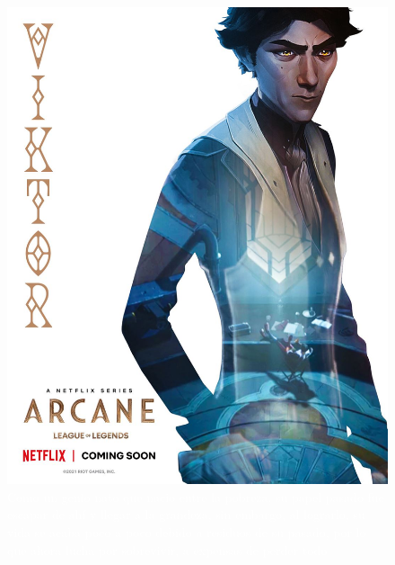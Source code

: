 \documentclass[11pt,A5]{article}
\begin{document}
\begin{figure}
    \includegraphics[scale=0.1, angle=18]{Pelicula. Imagenes usadas/Viktor, personaje favorito junto a otro.jpg}
    \caption{\textcolor{white}{Como un genio nato que nacio entre la pobreza, su papel pasado fue escapar de ahí y llegar a la grandeza, sin embargo, al lograrlo, su vida se acaba poco a poco debido a residuos de su pasado, por lo que ahora lucha por sobrevivir, a expensas de perder todo}}
    \label{fig:my_label}
\end{figure}
\end{document}
